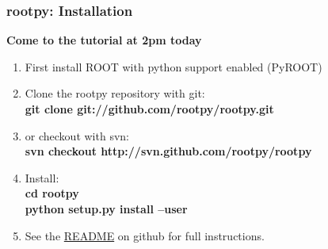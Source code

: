 \documentclass[hyperref={pdfpagelabels=false},professionalfonts,10pt,serif,table,xcolor=dvipsnames]{beamer}
\begin{document}
\begin{frame}[fragile]
    \frametitle{rootpy: Installation}
    
    \begin{center}
        {\bf Come to the tutorial at 2pm today}
    \end{center}

    \begin{enumerate}
        \itemsep=.3cm
        \item First install ROOT with python support enabled (PyROOT)
        \item Clone the rootpy repository with git:\\\vspace{.3cm}
            \hspace{1cm} {\bf git clone git://github.com/rootpy/rootpy.git}
        \item or checkout with svn:\\\vspace{.3cm}
            \hspace{1cm} {\bf svn checkout http://svn.github.com/rootpy/rootpy}
        \item Install:\\\vspace{.3cm}
            \hspace{1cm} {\bf cd rootpy}\\
            \hspace{1cm} {\bf python setup.py install --user}
        \item See the
                \href{https://github.com/rootpy/rootpy/blob/master/README.rst}{README} on github for full instructions.
    \end{enumerate}
\end{frame}




\end{document}
